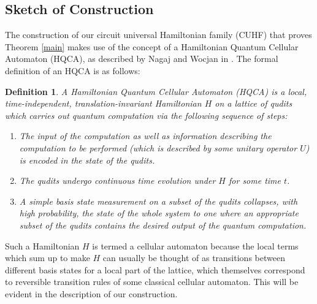 \documentclass[11pt,letterpaper]{article}
\newtheorem{definition}[theorem]{Definition}
\newcommand{\<}{\langle}
\renewcommand{\>}{\rangle}
\begin{document}


\subsection{Sketch of Construction}

The construction of our circuit universal Hamiltonian family (CUHF) that proves Theorem \ref{main} makes use of the concept of a Hamiltonian Quantum Cellular Automaton (HQCA), as described by Nagaj and Wocjan in \cite{NW}. The formal definition of an HQCA is as follows:
\begin{definition}\label{HQCA}
	A Hamiltonian Quantum Cellular Automaton (HQCA) is a local, time-independent, translation-invariant Hamiltonian $H$ on a lattice of qudits which carries out quantum computation via the following sequence of steps:
	\begin{enumerate}
		\item The input of the computation as well as information describing the computation to be performed (which is described by some unitary operator $U$) is encoded in the state of the qudits.
		\item The qudits undergo continuous time evolution under $H$ for some time $t$.
		\item A simple basis state measurement on a subset of the qudits collapses, with high probability, the state of the whole system to one where an appropriate subset of the qudits contains the desired output of the quantum computation.
	\end{enumerate}
\end{definition}
Such a Hamiltonian $H$ is termed a cellular automaton because the local terms which sum up to make $H$ can usually be thought of as transitions between different basis states for a local part of the lattice, which themselves correspond to reversible transition rules of some classical cellular automaton. This will be evident in the description of our construction.
\end{document}
